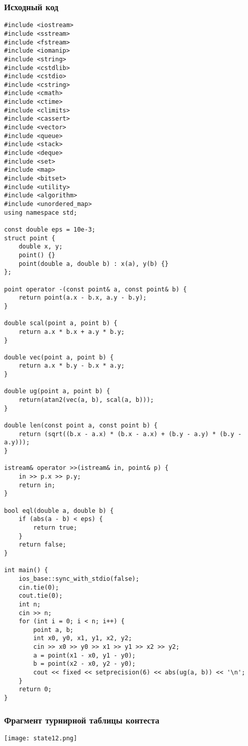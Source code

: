 \documentclass[12pt]{article}
\begin{document}
\subsubsection*{Исходный код}
\begin{lstlisting}
#include <iostream>
#include <sstream>
#include <fstream>
#include <iomanip>
#include <string>
#include <cstdlib>
#include <cstdio>
#include <cstring>
#include <cmath>
#include <ctime>
#include <climits>
#include <cassert>
#include <vector>
#include <queue>
#include <stack>
#include <deque>
#include <set>
#include <map>
#include <bitset>
#include <utility>
#include <algorithm>
#include <unordered_map>
using namespace std;

const double eps = 10e-3;
struct point {
    double x, y;
    point() {}
    point(double a, double b) : x(a), y(b) {}
};

point operator -(const point& a, const point& b) {
    return point(a.x - b.x, a.y - b.y);
}

double scal(point a, point b) {
    return a.x * b.x + a.y * b.y;
}

double vec(point a, point b) {
    return a.x * b.y - b.x * a.y;
}

double ug(point a, point b) {
    return(atan2(vec(a, b), scal(a, b)));
}

double len(const point a, const point b) {
    return (sqrt((b.x - a.x) * (b.x - a.x) + (b.y - a.y) * (b.y - a.y)));
}

istream& operator >>(istream& in, point& p) {
    in >> p.x >> p.y;
    return in;
}

bool eql(double a, double b) {
    if (abs(a - b) < eps) {
        return true;
    }
    return false;
}

int main() {
    ios_base::sync_with_stdio(false);
    cin.tie(0);
    cout.tie(0);
    int n;
    cin >> n;
    for (int i = 0; i < n; i++) {
        point a, b;
        int x0, y0, x1, y1, x2, y2;
        cin >> x0 >> y0 >> x1 >> y1 >> x2 >> y2;
        a = point(x1 - x0, y1 - y0);
        b = point(x2 - x0, y2 - y0);
        cout << fixed << setprecision(6) << abs(ug(a, b)) << '\n';
    }
    return 0;
}
\end{lstlisting}
\subsubsection*{Фрагмент турнирной таблицы контеста}
\begin{center}
\texttt{[image: state12.png]}\newline\noindent
\end{center}
\end{document}
